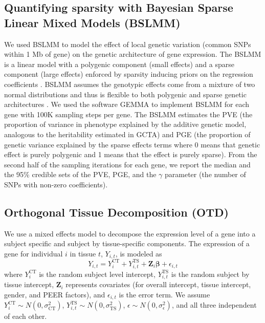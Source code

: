 \documentclass[10pt,letterpaper]{article}
\begin{document}
\subsection*{Quantifying sparsity with Bayesian Sparse Linear Mixed
Models
(BSLMM)}\label{quantifying-sparsity-with-bayesian-sparse-linear-mixed-models-bslmm}

We used BSLMM \cite{Zhou_2013} to model the effect of local genetic variation
(common SNPs within 1 Mb of gene) on the genetic architecture of gene
expression. The BSLMM is a linear model with a polygenic component (small effects) and a sparse component (large effects)
enforced by sparsity inducing priors on the
regression coefficients \cite{Zhou_2013}. BSLMM assumes the genotypic effects come from a mixture of two normal distributions and thus is flexible to both polygenic and sparse genetic architectures \cite{Zhou_2013}. We used the software GEMMA \cite{Zhou_2012} to
implement BSLMM for each gene %
with 100K sampling steps per gene.
 The BSLMM estimates the PVE (the proportion of variance in
phenotype explained by the additive genetic model, analogous to the heritability estimated in GCTA) and PGE (the proportion of genetic variance explained by the sparse effects terms where 0 means that genetic effect is purely polygenic and 1 means that the effect is purely sparse). From the second half of the sampling iterations for each gene, we report the median and the 95\% credible sets of the
PVE, PGE, and the \textbar{}\(\gamma\)\textbar{} parameter (the number of SNPs with non-zero coefficients).

\subsection*{Orthogonal Tissue Decomposition (OTD)}\label{orthogonal-tissue-decomposition}

We use a mixed effects model to decompose the expression level of a gene into a subject specific and subject by tissue-specific components. The expression of a gene for individual $i$ in tissue $t$, $Y_{i,t}$, is modeled as
%
\[Y_{i,t} =  Y_{i}^{\text{CT}}   + Y_{i,t}^{\text{TS}} + \mathbf{Z}_i \boldsymbol{\beta} + \epsilon_{i,t}  \] 
%
where $Y_{i}^{\text{CT}}$ is the random subject level intercept,  $Y_{i,t}^{\text{TS}} $ is the random subject by tissue intercept, $\mathbf{Z}_i $ represents covariates (for overall intercept, tissue intercept, gender, and PEER factors), and $\epsilon_{i,t}$ is the error term. We assume $Y_{i}^{\text{CT}} \sim N(0,\sigma_{\text{CT}}^2)$, $Y_{i,t}^{\text{TS}} \sim N(0,\sigma_{\text{TS}}^2)$, $\epsilon \sim N(0,\sigma^2_{\epsilon})$, and all three independent of each other.
\end{document}
